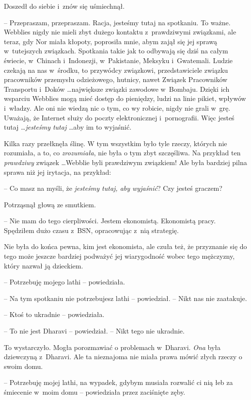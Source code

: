 \documentclass[oneside,polish,11pt,rmheadings]{mwbk}
\begin{document}
Doszedł do siebie i~znów się uśmiechnął. 

-- Przepraszam, przepraszam. Racja, jesteśmy tutaj na spotkaniu. To ważne. Webblies nigdy nie mieli zbyt dużego kontaktu z~prawdziwymi związkami, ale teraz, gdy Nor miała kłopoty, poprosiła mnie, abym zajął się jej sprawą w~tutejszych związkach. Spotkania takie jak to odbywają się dziś na całym świecie, w~Chinach i~Indonezji, w~Pakistanie, Meksyku i~Gwatemali. Ludzie czekają na nas w~środku, to przywódcy związkowi, przedstawiciele związku pracowników przemysłu odzieżowego, hutnicy, nawet Związek Pracowników Transportu i~Doków \ldots  największe związki zawodowe w~Bombaju. Dzięki ich wsparciu Webblies mogą mieć dostęp do pieniędzy, ludzi na linie pikiet, wpływów i~władzy. Ale oni nie wiedzą nic o tym, co wy robicie, nigdy nie grali w~grę. Uważają, że Internet służy do poczty elektronicznej i~pornografii. Więc jesteś tutaj  \ldots  \textit{jesteśmy tutaj } \ldots  aby im to wyjaśnić. 

Kilka razy przełknęła ślinę. W tym wszystkim było tyle rzeczy, których nie rozumiała, a to, co \textit{zrozumiała}, nie była o tym zbyt szczęśliwa. Na przykład ten \textit{prawdziwy }związek  \ldots  Webblie byli prawdziwym związkiem! Ale była bardziej pilna sprawa niż jej irytacja, na przykład: 

-- Co masz na myśli, że \textit{jesteśmy tutaj, aby wyjaśnić}? Czy jesteś graczem?

Potrząsnął głową ze smutkiem. 

-- Nie mam do tego cierpliwości. Jestem ekonomistą. Ekonomistą pracy. Spędziłem dużo czasu z~BSN, opracowując z~nią strategię.

Nie była do końca pewna, kim jest ekonomista, ale czuła też, że przyznanie się do tego może jeszcze bardziej podważyć jej wiarygodność wobec tego mężczyzny, który nazwał ją dzieckiem. 

-- Potrzebuję mojego lathi -- powiedziała.

-- Na tym spotkaniu nie potrzebujesz lathi -- powiedział. -- Nikt nas nie zaatakuje. 

-- Ktoś to ukradnie -- powiedziała.

-- To nie jest Dharavi -- powiedział. -- Nikt tego nie ukradnie.

To wystarczyło. Mogła porozmawiać o problemach w~Dharavi. \textit{Ona }była dziewczyną z~Dharavi. Ale ta nieznajoma nie miała prawa mówić złych rzeczy o swoim domu. 

-- Potrzebuję mojej lathi, na wypadek, gdybym musiała rozwalić ci nią łeb za śmiecenie w~moim domu -- powiedziała przez zaciśnięte zęby.
\end{document}
